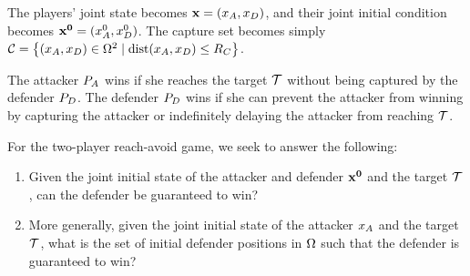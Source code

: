 The players' joint state becomes $\mathbf{x}=(x_A,x_D)$, and their joint initial condition becomes $\mathbf{x^0}=(x_A^0,x_D^0)$. The capture set becomes simply $\mathcal{C} = \left\{(x_A,x_D)\in\Omega^2 \mid \text{dist}(x_A,x_D)\leq R_C\right\}$. 

The attacker $P_A$ wins if she reaches the target $\mathcal{T}$ without being captured by the defender $P_D$. The defender $P_D$ wins if she can prevent the attacker from winning by capturing the attacker or indefinitely delaying the attacker from reaching $\mathcal{T}$. 

For the two-player reach-avoid game, we seek to answer the following:
\begin{enumerate}
\item Given the joint initial state of the attacker and defender $\mathbf{x^0}$ and the target $\mathcal{T}$, can the defender be guaranteed to win? \label{p:tp1}
\item More generally, given the joint initial state of the attacker $x_A$ and the target $\mathcal{T}$, what is the set of initial defender positions in $\Omega$ such that the defender is guaranteed to win? \label{p:tp2}
\end{enumerate}